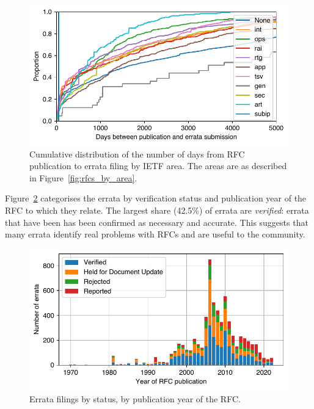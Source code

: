 \documentclass[twocolumn,10pt]{article}
\newlength{\figureWidthOneColumn}
\newcommand{\pb}[1]{\vspace{0.75ex}\noindent{\textbf{#1}}}
\begin{document}
\begin{figure}
  \centering
  \includegraphics[width=\figureWidthOneColumn]{figures-prev/tma-2023/errata-submission-dates-area.pdf}
  \caption{
    Cumulative distribution of the number of days from RFC publication to
    errata filing by IETF area.
    The areas are as described in Figure~\ref{fig:rfcs_by_area}.
  }
  \label{fig:errata_submission_days}
\end{figure}


\pb{Errata Status:}
Figure~\ref{fig:errata_status} categorises the errata by verification
status and publication year of the RFC to which they relate. 
The largest share (42.5\%) of errata are \emph{verified}: errata that have
been has been confirmed as necessary and accurate. This suggests that many
errata identify real problems with RFCs and are useful to the community.


\begin{figure}
  \centering
  \includegraphics[width=\figureWidthOneColumn]{figures-prev/tma-2023/errata-by-status.pdf}
  \caption{
    Errata filings by status, by publication year of the RFC.
  }
  \label{fig:errata_status}
\end{figure}
\end{document}
